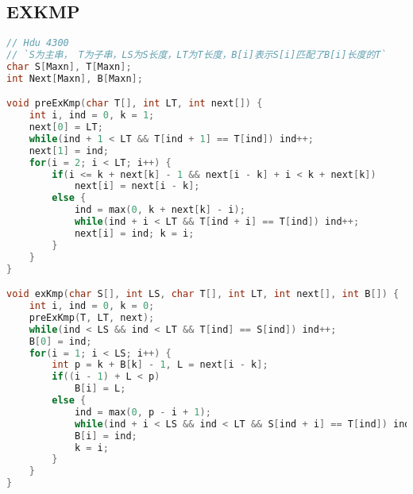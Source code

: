﻿\subsection{EXKMP}
\begin{lstlisting}[language=C++]
// Hdu 4300
// `S为主串， T为子串，LS为S长度，LT为T长度，B[i]表示S[i]匹配了B[i]长度的T`
char S[Maxn], T[Maxn];
int Next[Maxn], B[Maxn];

void preExKmp(char T[], int LT, int next[]) {
    int i, ind = 0, k = 1;
    next[0] = LT;
    while(ind + 1 < LT && T[ind + 1] == T[ind]) ind++;
    next[1] = ind;
    for(i = 2; i < LT; i++) {
        if(i <= k + next[k] - 1 && next[i - k] + i < k + next[k])
            next[i] = next[i - k];
        else {
            ind = max(0, k + next[k] - i);
            while(ind + i < LT && T[ind + i] == T[ind]) ind++;
            next[i] = ind; k = i;
        }
    }
}

void exKmp(char S[], int LS, char T[], int LT, int next[], int B[]) {
    int i, ind = 0, k = 0;
    preExKmp(T, LT, next);
    while(ind < LS && ind < LT && T[ind] == S[ind]) ind++;
    B[0] = ind;
    for(i = 1; i < LS; i++) {
        int p = k + B[k] - 1, L = next[i - k];
        if((i - 1) + L < p)
            B[i] = L;
        else {
            ind = max(0, p - i + 1);
            while(ind + i < LS && ind < LT && S[ind + i] == T[ind]) ind++;
            B[i] = ind;
            k = i;
        }
    }
}
	
\end{lstlisting}